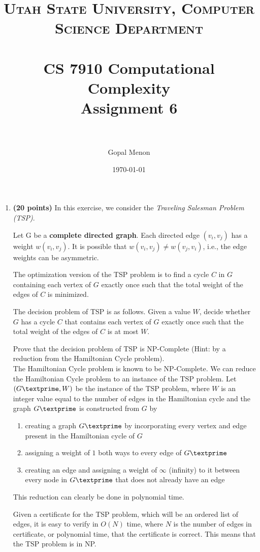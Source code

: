 \documentclass[paper=a4, fontsize=11pt]{scrartcl} %
\title{	
\normalfont \normalsize 
\textsc{Utah State University, Computer Science Department} \\ [25pt] %
\horrule{0.5pt} \\[0.4cm] %
\huge CS 7910 Computational Complexity\\Assignment 6 \\ %
\horrule{2pt} \\[0.5cm] %
}
\author{Gopal Menon} %
\date{\normalsize\today} %
\numberwithin{equation}{section} %
\numberwithin{figure}{section} %
\numberwithin{table}{section} %
\begin{document}
\maketitle %

\begin{enumerate}
\item \textbf{(20 points)} In this exercise, we consider the \emph{Traveling Salesman Problem (TSP)}.

Let G be a \textbf{complete directed graph}. Each directed edge $(v_i,v_j)$ has a weight $w(v_i,v_j)$. It is possible that $w(v_i,v_j) \neq w(v_j,v_i)$, i.e., the edge weights can be asymmetric.

The optimization version of the TSP problem is to find a cycle $C$ in $G$ containing each vertex of $G$ exactly once such that the total weight of the edges of $C$ is minimized.

The decision problem of TSP is as follows. Given a value $W$, decide whether $G$ has a cycle $C$ that contains each vertex of $G$ exactly once such that the total weight of the edges of $C$ is at most $W$.

Prove that the decision problem of TSP is NP-Complete (Hint: by a reduction from the Hamiltonian Cycle problem).\\

The Hamiltonian Cycle problem is known to be NP-Complete. We can reduce the Hamiltonian Cycle problem to an instance of the TSP problem. Let $(G\textprime, W)$ be the instance of the TSP problem, where $W$ is an integer value equal to the number of edges in the Hamiltonian cycle and the graph $G\textprime$ is constructed from $G$ by 
\begin{enumerate}
\item creating a graph $G\textprime$ by incorporating every vertex and edge present in the Hamiltonian cycle of $G$
\item assigning a weight of $1$ both ways to every edge of $G\textprime$ 
\item creating an edge and assigning a weight of $\infty$ (infinity) to it between every node in $G\textprime$ that does not already have an edge
\end{enumerate} 

This reduction can clearly be done in polynomial time.

Given a certificate for the TSP problem, which will be an ordered list of edges, it is easy to verify in $O(N)$ time, where $N$ is the number of edges in certificate, or polynomial time, that the certificate is correct. This means that the TSP problem is in NP.


\end{enumerate}
\end{document}
